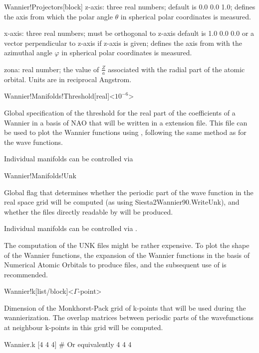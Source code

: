 \begin{fdfentry}{Wannier!Projectors}[block]
   z-axis: three real numbers; default is 0.0 0.0 1.0;
   defines the axis from which the polar angle $\theta$
   in spherical polar coordinates is measured.

   x-axis: three real numbers; must be orthogonal to z-axis\;
   default is 1.0 0.0 0.0 or a vector perpendicular to z-axis
   if z-axis is given; defines the axis from with the azimuthal
   angle $\varphi$ in spherical polar coordinates is measured.

   zona: real number; the value of $\frac{Z}{a}$ associated with
   the radial part of the atomic orbital. Units are in reciprocal Angstrom.

  \end{fdfentry}


  \begin{fdfentry}{Wannier!Manifolds!Threshold}[real]<$10^{-6}$>

    Global specification of the threshold for the real part of the
    coefficients of a Wannier in a basis of NAO that will be written in
    a  extension file.
    This file can be used to plot the Wannier functions using
    , following the same method as for the wave functions.

    Individual manifolds can be controlled via

  \end{fdfentry}

  \begin{fdflogicalF}{Wannier!Manifolds!Unk}

    Global flag that determines whether the periodic part of the wave function
    in the real space grid will be computed (as using Siesta2Wannier90.WriteUnk),
    and whether the files  directly readable by 
    will be produced.

    Individual manifolds can be controlled via
    .

    The computation of the UNK files might be rather expensive.
    To plot the shape of the Wannier functions, the expansion of the Wannier functions
    in the basis of Numerical Atomic Orbitals to produce  files, and the
    subsequent use of  is recommended.

  \end{fdflogicalF}

  \begin{fdfentry}{Wannier!k}[list/block]<$\Gamma$-point>

    Dimension of the Monkhorst-Pack grid of k-points that will be used
    during the wannierization.
    The overlap matrices between periodic parts of the wavefunctions
    at neighbour k-points in this grid will be computed.

    \begin{fdfexample}
  Wannier.k [4 4 4]
  # Or equivalently
     4  4  4
    \end{fdfexample}
  \end{fdfentry}
